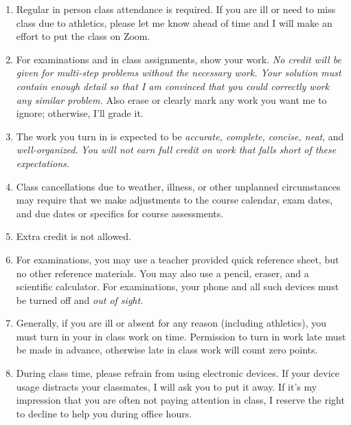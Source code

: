 \documentclass[12pt]{article}
\newcounter{ex}\setcounter{ex}{0}
\begin{document}
\begin{enumerate}

\item Regular in person class attendance is required. If you are ill or need to miss 
class due to athletics, please let me know ahead of time and I will make an effort to put the class on Zoom.

\item For examinations and in class assignments, show your work.  \emph{No credit will be given for multi-step problems without the necessary work. Your solution must contain enough detail
so that I am convinced that you could correctly work any similar problem.} Also erase or clearly mark any work you want me to ignore; otherwise,
I'll grade it.  

\item The work you turn in is expected to be \emph{accurate, 
complete, concise, neat}, and \emph{well-organized}.  
\emph{You will not earn full credit on work that falls short of 
these expectations.}

\item Class cancellations due to weather, illness, or other 
unplanned circumstances may require that we make  adjustments
to the course calendar, exam dates, and due dates or specifics for 
course assessments. 


\item Extra credit is not allowed. 



\item For examinations, you may use a teacher provided quick reference sheet, 
but no other reference materials. You may also use a pencil, eraser, 
and a scientific calculator. For examinations, your phone and all such
devices must be turned off and \emph{out of sight}. 

\item Generally, if you are ill or absent for any reason (including 
athletics), you must turn in your in class work on time. Permission to
turn in work late must be made in advance, otherwise late in class work 
will count zero points.


 

\item During class time, please refrain from using electronic devices. If your 
device usage distracts your classmates, I will ask you to put it away. If it's my 
impression that you are often not paying attention in class, I reserve the right to 
decline to help you during office hours.


\end{enumerate}
\end{document}
